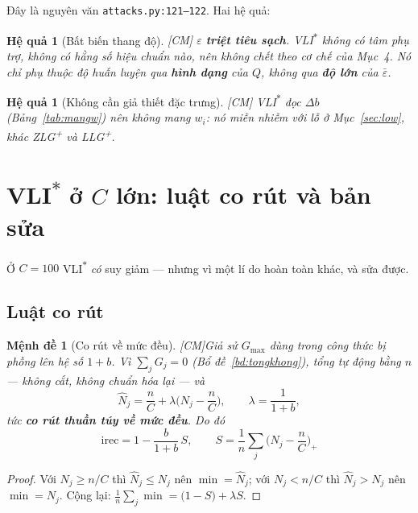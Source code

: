 \documentclass[11pt,a4paper]{article}
\newtheorem{menhde}[dinhly]{Mệnh đề}
\newtheorem{hequa}[dinhly]{Hệ quả}
\theoremstyle{remark}
\newcommand{\code}[1]{\texttt{\small #1}}
\newcommand{\CM}{\textsf{[CM]}}
\begin{document}
Đây là nguyên văn \code{attacks.py:121--122}. Hai hệ quả:

\begin{hequa}[Bất biến thang độ] \CM
$\varepsilon$ \textbf{triệt tiêu sạch}. VLI\textsuperscript{$*$} không có tâm
phụ trợ, không có hằng số hiệu chuẩn nào, nên \emph{không} chết theo cơ chế của
Mục~4. Nó chỉ phụ thuộc độ huấn luyện qua \textbf{hình dạng} của $Q$, không qua
\textbf{độ lớn} của $\bar\varepsilon$.
\end{hequa}

\begin{hequa}[Không cần giả thiết đặc trưng] \CM
VLI\textsuperscript{$*$} đọc $\Delta b$ (Bảng~\ref{tab:mangw}) nên không mang
$w_i$: nó miễn nhiễm với lỗ ở Mục~\ref{sec:low}, khác ZLG\textsuperscript{+} và
LLG\textsuperscript{+}.
\end{hequa}

\section{VLI\textsuperscript{$*$} ở $C$ lớn: luật co rút và bản sửa}
\label{sec:corut}

Ở $C=100$ VLI\textsuperscript{$*$} \emph{có} suy giảm --- nhưng vì một lí do
hoàn toàn khác, và sửa được.

\subsection{Luật co rút}

\begin{menhde}[Co rút về mức đều] \CM\label{md:luat}
Giả sử $G_{\max}$ dùng trong công thức bị phồng lên hệ số $1+b$. Vì
$\sum_j G_j=0$ (Bổ đề~\ref{bd:tongkhong}), tổng tự động bằng $n$ --- không cắt,
không chuẩn hóa lại --- và
\[
  \hat N_j=\frac nC+\lambda\Big(N_j-\frac nC\Big),
  \qquad \lambda=\frac{1}{1+b},
\]
tức \textbf{co rút thuần túy về mức đều}. Do đó
\[
  \boxed{\;\mathrm{irec}=1-\frac{b}{1+b}\,S,
  \qquad S=\frac1n\sum_j\Big(N_j-\frac nC\Big)_{\!+}\;}
\]
\end{menhde}

\begin{proof}
Với $N_j\ge n/C$ thì $\hat N_j\le N_j$ nên $\min=\hat N_j$; với $N_j<n/C$ thì
$\hat N_j>N_j$ nên $\min=N_j$. Cộng lại:
$\frac1n\sum_j\min=\big(1-S\big)+\lambda S$.
\end{proof}
\end{document}
